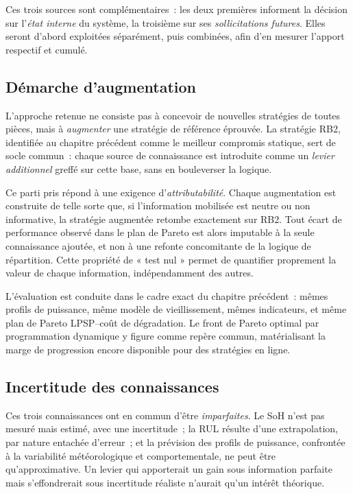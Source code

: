 Ces trois sources sont complémentaires~: les deux premières informent la décision sur l'\emph{état interne} du système, la troisième sur ses \emph{sollicitations futures}. Elles seront d'abord exploitées séparément, puis combinées, afin d'en mesurer l'apport respectif et cumulé.

\subsection{Démarche d'augmentation}

L'approche retenue ne consiste pas à concevoir de nouvelles stratégies de toutes pièces, mais à \emph{augmenter} une stratégie de référence éprouvée. La stratégie RB2, identifiée au chapitre précédent comme le meilleur compromis statique, sert de socle commun~: chaque source de connaissance est introduite comme un \emph{levier additionnel} greffé sur cette base, sans en bouleverser la logique.

Ce parti pris répond à une exigence d'\emph{attributabilité}. Chaque augmentation est construite de telle sorte que, si l'information mobilisée est neutre ou non informative, la stratégie augmentée retombe exactement sur RB2. Tout écart de performance observé dans le plan de Pareto est alors imputable à la seule connaissance ajoutée, et non à une refonte concomitante de la logique de répartition. Cette propriété de « test nul » permet de quantifier proprement la valeur de chaque information, indépendamment des autres.

L'évaluation est conduite dans le cadre exact du chapitre précédent~: mêmes profils de puissance, même modèle de vieillissement, mêmes indicateurs, et même plan de Pareto LPSP--coût de dégradation. Le front de Pareto optimal par programmation dynamique y figure comme repère commun, matérialisant la marge de progression encore disponible pour des stratégies en ligne.

\subsection{Incertitude des connaissances}

Ces trois connaissances ont en commun d'être \emph{imparfaites}. Le SoH n'est pas mesuré mais estimé, avec une incertitude~; la RUL résulte d'une extrapolation, par nature entachée d'erreur~; et la prévision des profils de puissance, confrontée à la variabilité météorologique et comportementale, ne peut être qu'approximative. Un levier qui apporterait un gain sous information parfaite mais s'effondrerait sous incertitude réaliste n'aurait qu'un intérêt théorique.

